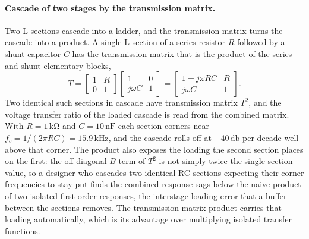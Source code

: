 \paragraph{Cascade of two stages by the transmission matrix.}
Two L-sections cascade into a ladder, and the transmission matrix turns
the cascade into a product. A single L-section of a series resistor $R$
followed by a shunt capacitor $C$ has the transmission matrix that is the
product of the series and shunt elementary blocks,
\[
T = \begin{bmatrix} 1 & R \\ 0 & 1 \end{bmatrix}
\begin{bmatrix} 1 & 0 \\ j\omega C & 1 \end{bmatrix}
= \begin{bmatrix} 1 + j\omega RC & R \\ j\omega C & 1 \end{bmatrix}.
\]
Two identical such sections in cascade have transmission matrix $T^{2}$,
and the voltage transfer ratio of the loaded cascade is read from the
combined matrix. With $R = 1\,\si{\kilo\ohm}$ and $C = 10\,\si{\nano
\farad}$ each section corners near $f_c = 1/(2\pi RC) = 15.9\,\si{\kilo
\hertz}$, and the cascade rolls off at $-40\,\si{\decibel}$ per decade
well above that corner. The product also exposes the loading the second
section places on the first: the off-diagonal $B$ term of $T^{2}$ is not
simply twice the single-section value, so a designer who cascades two
identical RC sections expecting their corner frequencies to stay put finds
the combined response sags below the naive product of two isolated
first-order responses, the interstage-loading error that a buffer between
the sections removes. The transmission-matrix product carries that loading
automatically, which is its advantage over multiplying isolated transfer
functions.


